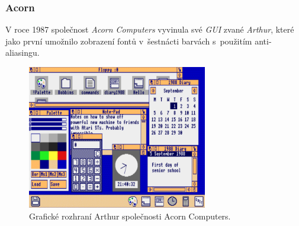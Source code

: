 \documentclass[11pt,twoside,a4paper]{book}
\begin{document}
\subsubsection{Acorn}
V roce 1987 společnost \textit{Acorn Computers} vyvinula své \textit{GUI} zvané \textit{Arthur}, které jako první umožnilo zobrazení fontů v~šestnácti barvách s~použitím anti-aliasingu.
\begin{figure}[!ht]
\begin{center}
  \includegraphics[width=0.7\textwidth]{arthur}
\caption{{\label{fig:arthurGUI}}Grafické rozhraní Arthur společnosti Acorn Computers.\cite{bib:arthurImage}}
\end{center}
\end{figure}
\end{document}
